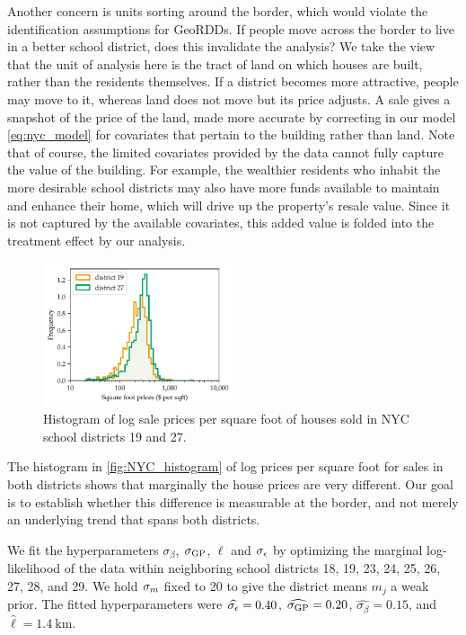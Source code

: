 Another concern is units sorting around the border, which would violate the identification assumptions for GeoRDDs.
If people move across the border to live in a better school district, does this invalidate the analysis?
We take the view that the unit of analysis here is the tract of land on which houses are built, rather than the residents themselves.
If a district becomes more attractive, people may move to it, whereas land does not move but its price adjusts.
A sale gives a snapshot of the price of the land, made more accurate by correcting in our model \autoref{eq:nyc_model} for covariates that pertain to the building rather than land.
Note that of course, the limited covariates provided by the data cannot fully capture the value of the building.
For example, the wealthier residents who inhabit the more desirable school districts may also have more funds available to maintain and enhance their home, which will drive up the property's resale value.
Since it is not captured by the available covariates, this added value is folded into the treatment effect by our analysis.

\begin{figure}[tb]
    \centering
    \includegraphics[width=0.5\textwidth]{figures/sales_histogram_19-27.pdf}
    \caption{\label{fig:NYC_histogram}Histogram of log sale prices per square foot of houses sold in NYC school districts 19 and 27.}
\end{figure}

The histogram in \autoref{fig:NYC_histogram} of log prices per square foot for sales in both districts shows that marginally the house prices are very different.
Our goal is to establish whether this difference is measurable at the border, and not merely an underlying trend that spans both districts.

We fit the hyperparameters \(\sigma_\beta\), \(\sigma_{\mathrm{GP}}\), \(\ell\) and \(\sigma_{\epsilon}\) by optimizing the marginal log-likelihood of the data within neighboring school districts 18, 19, 23, 24, 25, 26, 27, 28, and 29.
We hold \(\sigma_{m}\) fixed to 20 to give the district means \(m_j\) a weak prior.
The fitted hyperparameters were \(\widehat{\sigma_{\epsilon}}=0.40\), \(\widehat{\sigma_{\mathrm{GP}}}=0.20\), \(\widehat{\sigma_\beta}=0.15\), and \(\widehat{\ell}=1.4~\text{km}\).

